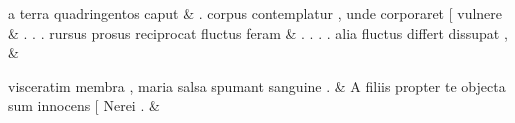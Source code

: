 \documentclass[12pt,onecolumn,twoside,a4paper]{memoir}
\begin{document}
\begin{pairs}
\begin{Leftside}
                              a
                              terra
                              quadringentos
                              caput \&
                         \stanza {}
                     .
                              corpus
                              contemplatur
                              ,
                              unde
                              corporaret
                              [
                              vulnere \&
                         \stanza {}
                     .
                              .
                              .
                              rursus
                              prosus
                              reciprocat
                              fluctus
                              feram \&
                         \stanza {}
                              .
                              .
                              .
                              .
                              alia
                              fluctus
                              differt
                              dissupat
                              , & 
                     
                              visceratim
                              membra
                              ,
                              maria
                              salsa
                              spumant
                              sanguine
                              . \&
                         \stanza {}
                     A
                              filiis
                              propter
                              te
                              objecta
                              sum
                              innocens
                              [
                              Nerei
                              . \&
                     
                  \endnumbering
		\end{Leftside}
                  \begin{Rightside}
			\beginnumbering
			\numberstanzafalse
                     

\end{Rightside}
\end{pairs}
\end{document}
